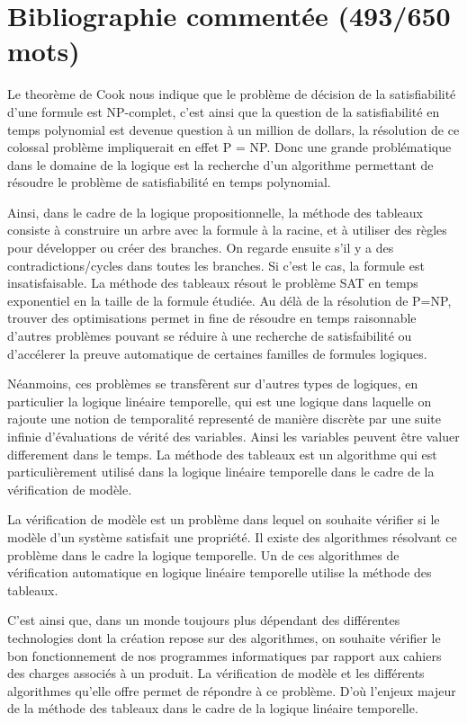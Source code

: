 \documentclass{paper}
\begin{document}
\section{Bibliographie commentée (493/650 mots)}

Le theorème de Cook nous indique que le problème de décision de la satisfiabilité d'une formule est NP-complet, c'est ainsi que la question de la 
satisfiabilité en temps polynomial est devenue question à un million de dollars, la résolution de ce colossal problème impliquerait en effet P = NP.  
Donc une grande problématique dans le domaine de la logique est la recherche d'un algorithme permettant de résoudre le problème de satisfiabilité en 
temps polynomial.

Ainsi, dans le cadre de la logique propositionnelle, la méthode des tableaux consiste à construire un  arbre avec la formule à la racine, et à utiliser 
des règles pour développer ou créer des branches. On regarde ensuite s'il y a des contradictions/cycles dans toutes les branches. Si c'est le cas, la 
formule est insatisfaisable. La méthode des tableaux résout le problème SAT en temps exponentiel en la taille de la formule étudiée. Au délà de la 
résolution de P=NP, trouver des optimisations permet in fine de résoudre en temps raisonnable d'autres problèmes pouvant se réduire à une recherche 
de satisfaibilité ou d'accélerer la preuve automatique de certaines familles de formules logiques.

Néanmoins, ces problèmes se transfèrent sur d'autres types de logiques, en particulier la logique linéaire temporelle, qui est une logique dans laquelle
on rajoute une notion de temporalité representé de manière discrète par une suite infinie d'évaluations de vérité des variables. Ainsi les variables 
peuvent être valuer differement dans le temps. La méthode des tableaux est un algorithme qui est particulièrement utilisé dans la logique linéaire 
temporelle dans le cadre de la vérification de modèle.

La vérification de modèle est un problème dans lequel on souhaite vérifier si le modèle d'un système satisfait une propriété. Il existe des algorithmes 
résolvant ce problème dans le cadre la logique temporelle. Un de ces algorithmes de vérification automatique en logique linéaire temporelle utilise
la méthode des tableaux.

C'est ainsi que, dans un monde toujours plus dépendant des différentes technologies dont la création repose sur des algorithmes, on souhaite vérifier le
bon fonctionnement de nos programmes informatiques par rapport aux cahiers des charges associés à un produit. La vérification de modèle et les différents
algorithmes qu'elle offre permet de répondre à ce problème. D'où l'enjeux majeur de la méthode des tableaux dans le cadre de la logique linéaire temporelle.
\end{document}
